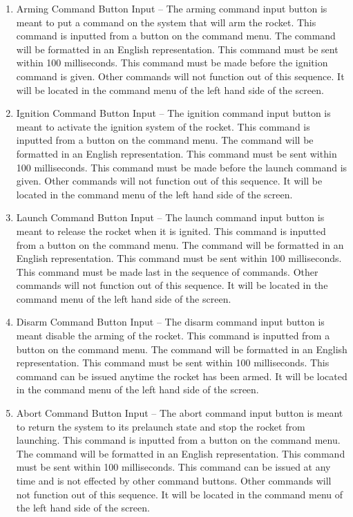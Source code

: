 \documentclass[10pt,draftclsnofoot,onecolumn,compsoc]{IEEEtran}
\begin{document}
\begin{enumerate}
\item Arming Command Button Input –
The arming command input button is meant to put a command on the system that will arm the rocket. This command is inputted from a button on the command menu. The command will be formatted in an English representation.  This command must be sent within 100 milliseconds. This command must be made before the ignition command is given. Other commands will not function out of this sequence. It will be located in the command menu of the left hand side of the screen.
\item Ignition Command Button Input –
The ignition command input button is meant to activate the ignition system of the rocket. This command is inputted from a button on the command menu. The command will be formatted in an English representation.  This command must be sent within 100 milliseconds. This command must be made before the launch command is given. Other commands will not function out of this sequence. It will be located in the command menu of the left hand side of the screen.
\item Launch Command Button Input –
The launch command input button is meant to release the rocket when it is ignited. This command is inputted from a button on the command menu. The command will be formatted in an English representation.  This command must be sent within 100 milliseconds. This command must be made last in the sequence of commands. Other commands will not function out of this sequence. It will be located in the command menu of the left hand side of the screen.
\item Disarm Command Button Input –
The disarm command input button is meant disable the arming of the rocket. This command is inputted from a button on the command menu. The command will be formatted in an English representation.  This command must be sent within 100 milliseconds. This command can be issued anytime the rocket has been armed. It will be located in the command menu of the left hand side of the screen.
\item Abort Command Button Input –
The abort command input button is meant to return the system to its prelaunch state and stop the rocket from launching. This command is inputted from a button on the command menu. The command will be formatted in an English representation.  This command must be sent within 100 milliseconds. This command can be issued at any time and is not effected by other command buttons. Other commands will not function out of this sequence. It will be located in the command menu of the left hand side of the screen.

\end{enumerate}
\end{document}
